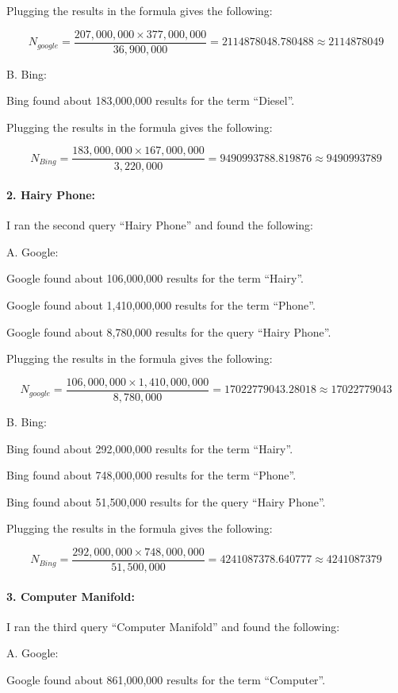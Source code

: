 \documentclass[a4paper, 11pt]{article}
\begin{document}
Plugging the results in the formula gives the following:

$$N_{google} = \frac{207,000,000 \times 377,000,000}{36,900,000} = 2114878048.780488 \approx 2114878049
$$


\pagebreak

B. Bing:

Bing found about 183,000,000 results for the term ``Diesel''.

Plugging the results in the formula gives the following:

$$N_{Bing} = \frac{183,000,000 \times 167,000,000}{3,220,000} = 9490993788.819876 \approx 9490993789
$$


\paragraph{2. Hairy Phone:}
I ran the second query ``Hairy Phone'' and found the following:

A. Google:

Google found about 106,000,000 results for the term ``Hairy''.

Google found about 1,410,000,000 results for the term ``Phone''.

Google found about 8,780,000 results for the query ``Hairy Phone''.

Plugging the results in the formula gives the following:

$$N_{google} = \frac{106,000,000 \times 1,410,000,000}{8,780,000} = 17022779043.28018 \approx 17022779043
$$

B. Bing:

Bing found about 292,000,000 results for the term ``Hairy''.

Bing found about 748,000,000 results for the term ``Phone''.

Bing found about 51,500,000 results for the query ``Hairy Phone''.

Plugging the results in the formula gives the following:

$$N_{Bing} = \frac{292,000,000 \times 748,000,000}{51,500,000} = 4241087378.640777 \approx 4241087379
$$

\paragraph{3. Computer Manifold:}
I ran the third query ``Computer Manifold'' and found the following:

A. Google:

Google found about 861,000,000 results for the term ``Computer''.
\end{document}
